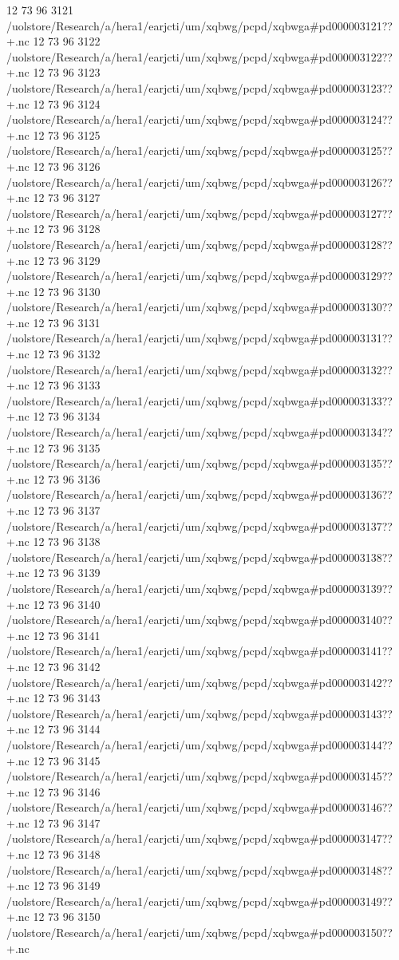 12 73 96
3121
/uolstore/Research/a/hera1/earjcti/um/xqbwg/pcpd/xqbwga#pd000003121??+.nc
12 73 96
3122
/uolstore/Research/a/hera1/earjcti/um/xqbwg/pcpd/xqbwga#pd000003122??+.nc
12 73 96
3123
/uolstore/Research/a/hera1/earjcti/um/xqbwg/pcpd/xqbwga#pd000003123??+.nc
12 73 96
3124
/uolstore/Research/a/hera1/earjcti/um/xqbwg/pcpd/xqbwga#pd000003124??+.nc
12 73 96
3125
/uolstore/Research/a/hera1/earjcti/um/xqbwg/pcpd/xqbwga#pd000003125??+.nc
12 73 96
3126
/uolstore/Research/a/hera1/earjcti/um/xqbwg/pcpd/xqbwga#pd000003126??+.nc
12 73 96
3127
/uolstore/Research/a/hera1/earjcti/um/xqbwg/pcpd/xqbwga#pd000003127??+.nc
12 73 96
3128
/uolstore/Research/a/hera1/earjcti/um/xqbwg/pcpd/xqbwga#pd000003128??+.nc
12 73 96
3129
/uolstore/Research/a/hera1/earjcti/um/xqbwg/pcpd/xqbwga#pd000003129??+.nc
12 73 96
3130
/uolstore/Research/a/hera1/earjcti/um/xqbwg/pcpd/xqbwga#pd000003130??+.nc
12 73 96
3131
/uolstore/Research/a/hera1/earjcti/um/xqbwg/pcpd/xqbwga#pd000003131??+.nc
12 73 96
3132
/uolstore/Research/a/hera1/earjcti/um/xqbwg/pcpd/xqbwga#pd000003132??+.nc
12 73 96
3133
/uolstore/Research/a/hera1/earjcti/um/xqbwg/pcpd/xqbwga#pd000003133??+.nc
12 73 96
3134
/uolstore/Research/a/hera1/earjcti/um/xqbwg/pcpd/xqbwga#pd000003134??+.nc
12 73 96
3135
/uolstore/Research/a/hera1/earjcti/um/xqbwg/pcpd/xqbwga#pd000003135??+.nc
12 73 96
3136
/uolstore/Research/a/hera1/earjcti/um/xqbwg/pcpd/xqbwga#pd000003136??+.nc
12 73 96
3137
/uolstore/Research/a/hera1/earjcti/um/xqbwg/pcpd/xqbwga#pd000003137??+.nc
12 73 96
3138
/uolstore/Research/a/hera1/earjcti/um/xqbwg/pcpd/xqbwga#pd000003138??+.nc
12 73 96
3139
/uolstore/Research/a/hera1/earjcti/um/xqbwg/pcpd/xqbwga#pd000003139??+.nc
12 73 96
3140
/uolstore/Research/a/hera1/earjcti/um/xqbwg/pcpd/xqbwga#pd000003140??+.nc
12 73 96
3141
/uolstore/Research/a/hera1/earjcti/um/xqbwg/pcpd/xqbwga#pd000003141??+.nc
12 73 96
3142
/uolstore/Research/a/hera1/earjcti/um/xqbwg/pcpd/xqbwga#pd000003142??+.nc
12 73 96
3143
/uolstore/Research/a/hera1/earjcti/um/xqbwg/pcpd/xqbwga#pd000003143??+.nc
12 73 96
3144
/uolstore/Research/a/hera1/earjcti/um/xqbwg/pcpd/xqbwga#pd000003144??+.nc
12 73 96
3145
/uolstore/Research/a/hera1/earjcti/um/xqbwg/pcpd/xqbwga#pd000003145??+.nc
12 73 96
3146
/uolstore/Research/a/hera1/earjcti/um/xqbwg/pcpd/xqbwga#pd000003146??+.nc
12 73 96
3147
/uolstore/Research/a/hera1/earjcti/um/xqbwg/pcpd/xqbwga#pd000003147??+.nc
12 73 96
3148
/uolstore/Research/a/hera1/earjcti/um/xqbwg/pcpd/xqbwga#pd000003148??+.nc
12 73 96
3149
/uolstore/Research/a/hera1/earjcti/um/xqbwg/pcpd/xqbwga#pd000003149??+.nc
12 73 96
3150
/uolstore/Research/a/hera1/earjcti/um/xqbwg/pcpd/xqbwga#pd000003150??+.nc
